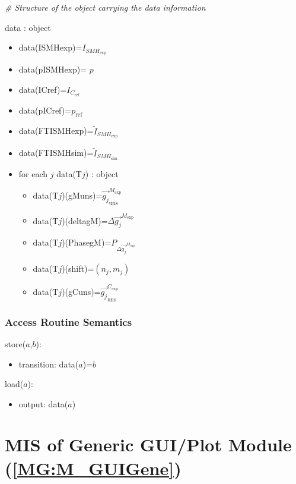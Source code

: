 \documentclass[12pt, titlepage]{article}
\begin{document}
\noindent\textit{{\#} Structure of the object carrying the data information}\medskip

data : object
\begin{itemize}
\item data(ISMHexp)=$I_{\mathit{SMH}_{\text{exp}}}$
\item data(pISMHexp)= $p$
\item data(ICref)=$I_{\mathit{C}_{\text{ref}}}$
\item data(pICref)=$p_{\text{ref}}$
\item data(FTISMHexp)=$\widetilde{I}_{\mathit{SMH}_{\text{exp}}}$
\item data(FTISMHsim)=$\widetilde{I}_{\mathit{SMH}_{\text{sim}}}$
\item for each $j$ data(T$j$) : object 
	\begin{itemize}
	\item data(T$j$)(gMuns)=$\overrightarrow{g_{j}}_{\text{uns}}^{M_{\text{exp}}}$
	\item data(T$j$)(deltagM)=$\Delta \overrightarrow{g_{j}}^{M_{\text{exp}}}$
	\item data(T$j$)(PhasegM)=$P_{\Delta \overrightarrow{g_{j}}^{M_{\text{exp}}}}$
	\item data(T$j$)(shift)=$(n_j,m_j)$
	\item data(T$j$)(gCuns)=$\overrightarrow{g_{j}}_{\text{uns}}^{C_{\text{exp}}}$
	\end{itemize}

\end{itemize}

\subsubsection{Access Routine Semantics}

\noindent store($a$,$b$):
\begin{itemize}
\item transition: data($a$)=$b$
\end{itemize}

\noindent load($a$):
\begin{itemize}
\item output: data($a$)
\end{itemize}

\section{MIS of Generic GUI/Plot Module (\texorpdfstring{\cref{MG:M_GUIGene}}))} \label{MIS_GUIGene}
\end{document}
